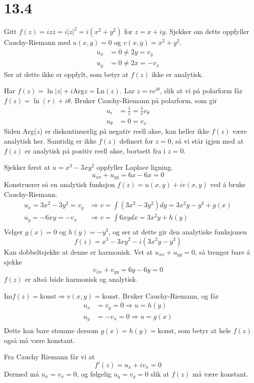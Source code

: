 \documentclass[11pt, a4paper, norsk]{NTNUoving}
\begin{document}
\section*{13.4}
\begin{oppgave}[2]
Gitt $f(z) = iz\overline{z}=i|z|^2=i(x^2+y^2)$ for $z=x+iy$. Sjekker om dette oppfyller Cauchy-Riemann med $u(x,y)=0$ og $v(x,y)=x^2+y^2$.
\begin{align*}
  u_x &= 0\neq 2y = v_y \\
  u_y &= 0\neq 2x = -v_x
\end{align*}
Ser at dette ikke er oppfylt, som betyr at $f(z)$ ikke er analytisk.
\end{oppgave}
\begin{oppgave}[10]
  Har $f(z)=\ln|z|+i\text{Arg}z=\text{Ln}(z)$. Lar $z=re^{i\theta}$, slik at vi på polarform får $f(z)=\ln(r) + i\theta$. Bruker Cauchy-Riemann på polarform, som gir
\begin{align*}
  u_r &= \frac{1}{r} =\frac{1}{r} v_{\theta}\\
  u_{\theta} &= 0 = v_x
\end{align*}
Siden Arg($z$) er diskontinuerlig på negativ reell akse, kan heller ikke $f(z)$ være analytisk her. Samtidig er ikke $f(z)$ definert for $z=0$, så vi står igjen med at $f(z)$ er analytisk på positiv reell akse, bortsett fra i $z=0$.
\end{oppgave}
\begin{oppgave}[18]
  Sjekker først at $u=x^3-3xy^2$ oppfyller Laplace ligning.
  \[
    u_{xx}+u_{yy}=6x-6x = 0
  \]
  Konstruerer så en analytisk funksjon $f(z)=u(x,y)+iv(x,y)$ ved å bruke Cauchy-Riemann.
  \begin{align*}
    u_x=3x^2-3y^2=v_y&\Rightarrow v = \int (3x^2-3y^2)dy = 3x^2y-y^3+g(x) \\
    u_y=-6xy=-v_x&\Rightarrow v = \int 6xy dx = 3x^2y+h(y) \\
  \end{align*}
  Velger $g(x)=0$ og $h(y)=-y^3$, og ser at dette gir den analytiske funksjonen
  \[
    f(z) = x^3-3xy^2 - i(3x^2y-y^3)
  \]
  Kan dobbeltsjekke at denne er harmonisk. Vet at $u_{xx}+u_{yy}=0$, så trenger bare å sjekke
  \[
    v_{xx}+v_{yy}=6y-6y=0
  \]
  $f(z)$ er altså både harmonisk og analytisk.
\end{oppgave}
\begin{oppgave}[30]
  \begin{punkt}[b]
    $\text{Im}f(z)=\text{konst}\Rightarrow v(x,y) = \text{konst}$. Bruker Cauchy-Riemann, og får
    \begin{align*}
      u_x&=v_y = 0 \Rightarrow u = h(y) \\
      u_y&=-v_x = 0 \Rightarrow u = g(x) \\
    \end{align*}
    Dette kan bare stemme dersom $g(x)=h(y)=\text{konst}$, som betyr at hele $f(z)$ også må være konstant.
  \end{punkt}
  \begin{punkt}[c]
    Fra Cauchy Riemann får vi at
    \[
      f'(z)=u_x+iv_x=0
    \]
    Dermed må $u_x=v_x=0$, og følgelig $u_y=v_y=0$ slik at $f(z)$ må være konstant.
  \end{punkt}
\end{oppgave}
\end{document}

